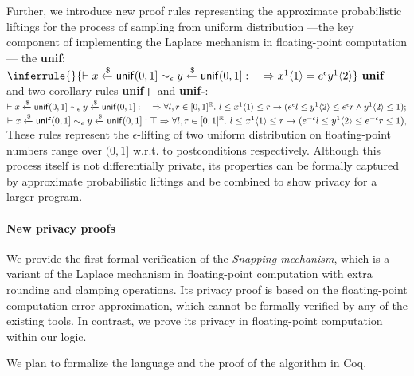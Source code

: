 \documentclass[a4paper,11pt]{article}
\begin{document}
Further, we introduce new proof rules representing the approximate probabilistic liftings for the process of sampling from uniform distribution 
---the key component of implementing the Laplace mechanism in floating-point computation---
the \textbf{unif}:
\\
$
\inferrule
{
	\empty
}
{
	\vdash
	\varx \samplel \uniform(0, 1] 	
	\sim_{\epsilon} 
	\vary \samplel \uniform(0, 1]
	:
	\top
	\Rightarrow
	\varx^1 \langle 1 \rangle 
	= 
	e^{\epsilon} \vary^1 \langle 2 \rangle 	
}~\textbf{unif}
$
\\
and two corollary rules \textbf{unif+} and \textbf{unif-}:
\\
$\vdash
	x \xleftarrow{\$} \mathsf{unif}(0, 1] 	
	\sim_{\epsilon} 
	y \xleftarrow{\$} \mathsf{unif}(0, 1]
	:
	\top
	\Rightarrow
	\forall l, r \in [0,1]^{\mathbb{R}}. ~
	l \leq x^1 \langle 1 \rangle \leq r 
	\rightarrow
	(e^{\epsilon} l \leq y^1 \langle 2 \rangle \leq e^{\epsilon}r \land y^1 \langle 2 \rangle\leq 1);	
$
\\
$\vdash
	x \xleftarrow{\$} \mathsf{unif}(0, 1] 	
	\sim_{\epsilon} 
	y \xleftarrow{\$} \mathsf{unif}(0, 1]
	:
	\top
	\Rightarrow
	\forall l, r \in [0,1]^{\mathbb{R}}. ~
	l \leq x^1 \langle 1 \rangle \leq r 
	\rightarrow
	(e^{-\epsilon} l \leq y^1 \langle 2 \rangle \leq e^{-\epsilon}r \leq 1),
$
\\
These rules represent the $\epsilon$-lifting of two uniform distribution on floating-point numbers range over $(0, 1]$ w.r.t. to postconditions respectively.
%
%
%
Although this process itself is not differentially private, its properties can be formally captured by approximate probabilistic liftings and be combined to show privacy for a larger program.
%
\paragraph{New privacy proofs}
We provide the first formal verification of the \emph{Snapping mechanism}, which is a variant of the Laplace mechanism in floating-point computation with extra rounding and clamping operations. 
Its privacy proof is based on the floating-point computation error approximation, which cannot be formally verified by any of the existing tools. 
In contrast, we prove its privacy in floating-point computation within our logic.

We plan to formalize the language and the proof of the algorithm in Coq.
\end{document}
